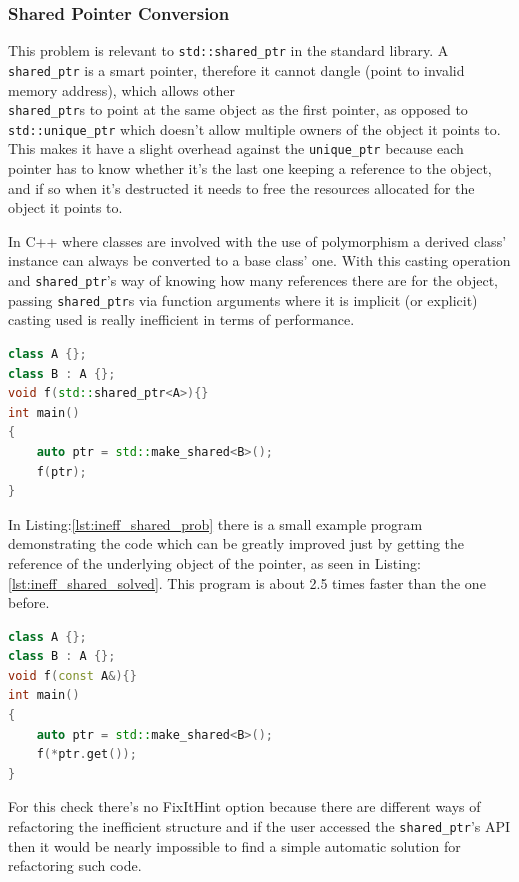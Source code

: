 \subsubsection{Shared Pointer Conversion}
\par This problem is relevant to \verb|std::shared_ptr| in the standard library. A \verb|shared_ptr| is a smart pointer, therefore it cannot dangle (point to invalid memory address), which allows other \\\verb|shared_ptr|s to point at the same object as the first pointer, as opposed to \verb|std::unique_ptr| which doesn't allow multiple owners of the object it points to. This makes it have a slight overhead against the \verb|unique_ptr| because each pointer has to know whether it's the last one keeping a reference to the object, and if so when it's destructed it needs to free the resources allocated for the object it points to. \medskip
\par In C++ where classes are involved with the use of polymorphism a derived class' instance can always be converted to a base class' one. With this casting operation and \verb|shared_ptr|'s way of knowing how many references there are for the object, passing \verb|shared_ptr|s via function arguments where it is implicit (or explicit) casting used is really inefficient in terms of performance. \medskip
\begin{lstlisting}[language=c++, frame=single ,caption={Inefficient implicit cast}, label={lst:ineff_shared_prob}]
class A {};
class B : A {};
void f(std::shared_ptr<A>){}
int main()
{
	auto ptr = std::make_shared<B>();
	f(ptr);
}
\end{lstlisting}
\par In Listing:\ref{lst:ineff_shared_prob} there is a small example program demonstrating the code which can be greatly improved just by getting the reference of the underlying object of the pointer, as seen in Listing:\ref{lst:ineff_shared_solved}. This program is about 2.5 times faster than the one before.
\begin{lstlisting}[language=c++, frame=single ,caption={A much faster version}, label={lst:ineff_shared_solved}]
class A {};
class B : A {};
void f(const A&){}
int main()
{
	auto ptr = std::make_shared<B>();
	f(*ptr.get());
}
\end{lstlisting}
\par For this check there's no FixItHint option because there are different ways of refactoring the inefficient structure and if the user accessed the \verb|shared_ptr|'s API then it would be nearly impossible to find a simple automatic solution for refactoring such code.
